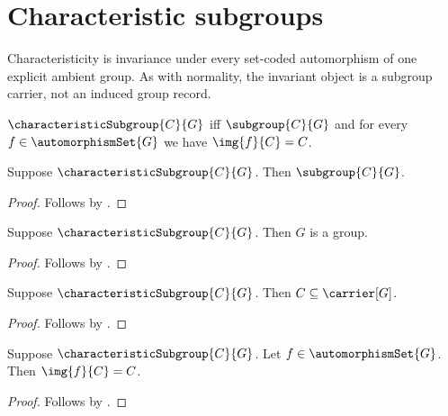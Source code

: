 

\section{Characteristic subgroups}

Characteristicity is invariance under every set-coded automorphism of one
explicit ambient group.  As with normality, the invariant object is a subgroup
carrier, not an induced group record.

\begin{definition}\label{characteristic_subgroup}
    $\characteristicSubgroup{C}{G}$ iff
        $\subgroup{C}{G}$ and
        for every $f\in\automorphismSet{G}$ we have
            $\img{f}{C}=C$.
\end{definition}

\begin{proposition}\label{characteristic_subgroup_is_subgroup}
    Suppose $\characteristicSubgroup{C}{G}$.
    Then $\subgroup{C}{G}$.
\end{proposition}
\begin{proof}
    Follows by .
\end{proof}

\begin{corollary}\label{characteristic_subgroup_ambient_group}
    Suppose $\characteristicSubgroup{C}{G}$.
    Then $G$ is a group.
\end{corollary}
\begin{proof}
    Follows by
        .
\end{proof}

\begin{corollary}\label{characteristic_subgroup_subseteq}
    Suppose $\characteristicSubgroup{C}{G}$.
    Then $C\subseteq\carrier[G]$.
\end{corollary}
\begin{proof}
    Follows by
        .
\end{proof}

\begin{proposition}\label{characteristic_subgroup_fixed_image}
    Suppose $\characteristicSubgroup{C}{G}$.
    Let $f\in\automorphismSet{G}$.
    Then $\img{f}{C}=C$.
\end{proposition}
\begin{proof}
    Follows by .
\end{proof}

